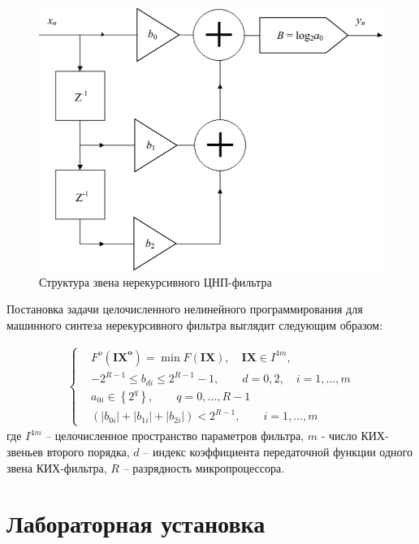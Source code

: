 \begin{figure}[H]
  \centering
  \includegraphics[width=\textwidth]{imgs/img2}
  \caption{Структура звена нерекурсивного ЦНП-фильтра}
  \label{fig:figure2}
\end{figure}

Постановка задачи целочисленного нелинейного программирования для машинного синтеза нерекурсивного фильтра выглядит следующим образом:

\begin{gather}
\left\{\begin{aligned}
  &F^{o}\left(\boldsymbol{I X}^{\boldsymbol{o}}\right)=
    \min F(\boldsymbol{I X}),  \quad
      \boldsymbol{I X} \in I^{4 m},\\
  &-2^{R-1} \leq b_{d i} \leq 2^{R-1}-1, \quad \quad d=0,2, \quad i=1,\ldots,m\\
  &a_{0 i} \in\left\{2^{q}\right\}, \quad \quad q=0,\ldots,R-1\\
  &\left(\left|b_{0 i}\right|+\left|b_{1 i}\right|+\left|b_{2 i}\right|\right)<2^{R-1}, \quad \quad i=1,\ldots,m
\end{aligned}\right.
\end{gather}
где $I^{4m}$ -- целочисленное пространство параметров фильтра, $m$ - число КИХ-звеньев второго
порядка, $d$ -- индекс коэффициента передаточной функции одного звена КИХ-фильтра, $R$ -- разрядность микропроцессора. 


\section{Лабораторная установка}

